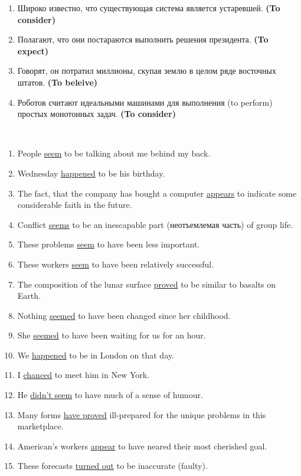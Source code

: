\documentclass[main.tex]{subfiles}
\begin{document}

\begin{enumerate}[nosep,leftmargin=*]
	\itemsep\eitsp
	\item Широко известно, что существующая система является устаревшей. \textbf{(To consider)}
	\item Полагают, что они постараются выполнить решения президента. \textbf{(To expect)}
	\item Говорят, он потратил миллионы, скупая землю в целом ряде восточных штатов. \textbf{(To beleive)}
	\item Роботов считают идеальными машинами для выполнения (to perform) простых монотонных задач. \textbf{(To consider)}
\end{enumerate}
\ 


\begin{enumerate}[nosep,leftmargin=*]
	\itemsep\eitsp
	\item People \uline{seem} to be talking about me behind my back.
	\item Wednesday \uline{happened} to be his birthday.
	\item The fact, that the company has bought a computer \uline{appears} to indicate some considerable faith in the future.
	\item Conflict \uline{seems} to be an inescapable part (неотъемлемая часть) of group life.
	\item These problems \uline{seem} to have been less important.
	\item These workers \uline{seem} to have been relatively successful.
	\item The composition of the lunar surface \uline{proved} to be similar to basalts on Earth.
	\item Nothing \uline{seemed} to have been changed since her childhood.
	\item She \uline{seemed} to have been waiting for us for an hour.
	\item We \uline{happened} to be in London on that day.
	\item I \uline{chanced} to meet him in New York.
	\item He \uline{didn't seem} to have much of a sense of humour.
	\item Many forms \uline{have proved} ill-prepared for the unique problems in this marketplace.
	\item American's workers \uline{appear} to have neared their most cherished goal.
	\item These forecasts \uline{turned out} to be inaccurate (faulty).
\end{enumerate}
\ 
\end{document}
